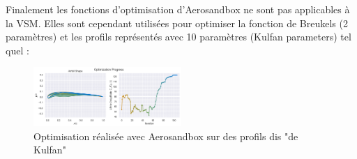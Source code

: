 \documentclass[conference]{IEEEtran}
\begin{document}
Finalement les fonctions d'optimisation d'Aerosandbox ne sont pas applicables à la VSM. Elles sont cependant utilisées pour optimiser la fonction de Breukels (2 paramètres) et les profils représentés avec 10 paramètres (Kulfan parameters) tel quel :  

\begin{figure}[H]
    \centering
    \includegraphics[width=0.5\textwidth]{Pics/optim neuralfoil.png}  
    \caption{Optimisation réalisée avec Aerosandbox sur des profils dis "de Kulfan"}
    \label{fig:kulfan}
\end{figure}
\end{document}

